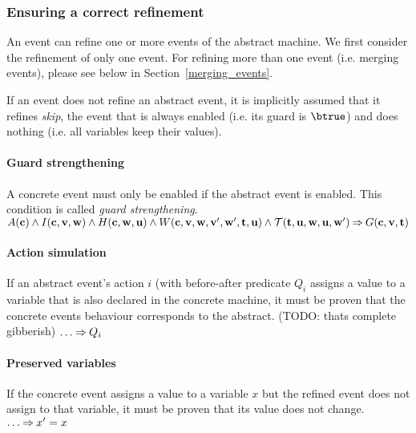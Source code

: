 \subsubsection{Ensuring a correct refinement}
\label{refinement_proof_obligations}
An event can refine one or more events of the abstract machine.
We first consider the refinement of only one event. 
For refining more than one event (i.e. merging events), please see below in Section~\ref{merging_events}.

If an event does not refine an abstract event, it is implicitly assumed that it refines \emph{skip}, the
  event that is always enabled (i.e. its guard is $\btrue$) and does nothing (i.e. all variables keep their
  values).

\paragraph{Guard strengthening}
A concrete event must only be enabled if the abstract event is enabled.
This condition is called \emph{guard strengthening}.
%
{}%
{$A(\mathbf{c}) \land I(\mathbf{c},{\mathbf{v},\mathbf{w}}) \land H(\mathbf{c},\mathbf{w},\mathbf{u}) \land W(\mathbf{c},{\mathbf{v},\mathbf{w}},\mathbf{v}',\mathbf{w}',{\mathbf{t},\mathbf{u}}) \land \mathcal{T}({\mathbf{t},\mathbf{u}},\mathbf{w},\mathbf{u},\mathbf{w}') \mathbin\Rightarrow G(\mathbf{c},\mathbf{v},\mathbf{t})$}

\paragraph{Action simulation}
If an abstract event's action $i$ (with before-after predicate $Q_i$ 
  assigns a value to a variable
  that is also declared in the concrete machine,
  it must be proven that the concrete events behaviour
  corresponds to the abstract. (TODO: thats complete gibberish)
%
  {}%
  {$\ldots \mathbin\Rightarrow Q_i$}

\paragraph{Preserved variables}
If the concrete event assigns a value to a variable $x$ but the refined
  event does not assign to that variable,
  it must be proven that its value does not change.
%
  {}%
  {$\ldots \mathbin\Rightarrow x'=x$}

